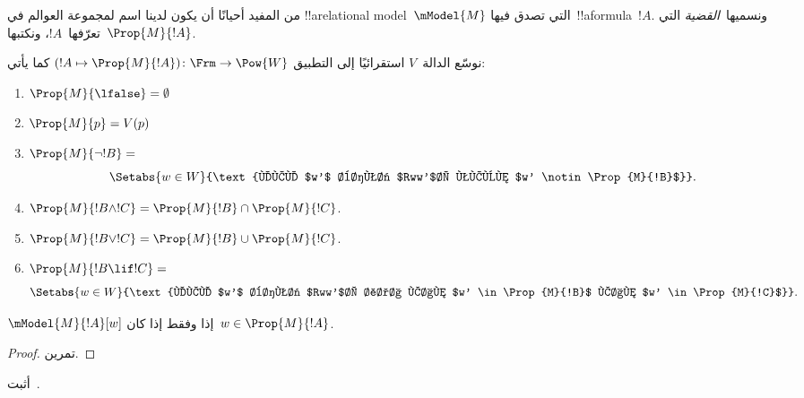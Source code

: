 \documentclass[../../../include/open-logic-section]{subfiles}
\begin{document}


من المفيد أحيانًا أن يكون لدينا اسم لمجموعة العوالم في
!!a{relational model}~$\mModel{M}$ التي تصدق فيها~!!a{formula}~$!A$.
ونسميها~\emph{القضية} التي تعرّفها~$!A$، ونكتبها~$\Prop{M}{!A}$.

\begin{defn}
  نوسّع الدالة~$V$ استقرائيًا إلى التطبيق
  $(!A \mapsto \Prop{M}{!A}) \colon \Frm \to \Pow{W}$ كما يأتي:
  \begin{enumerate}
  \item $\Prop{M}{\lfalse} = \emptyset$
  \item $\Prop{M}{p} = V(p)$
  \item $\Prop{M}{\lnot !B} = {}$
    \[
      \Setabs{w \in W}{\text{لكل $w'$ بحيث $Rww'$، يكون $w'
          \notin \Prop{M}{!B}$}}.
    \]
  \item $\Prop{M}{!B \land !C} = \Prop{M}{!B} \cap \Prop{M}{!C}$.
  \item $\Prop{M}{!B \lor !C} = \Prop{M}{!B} \cup \Prop{M}{!C}$.
  \item $\Prop{M}{!B \lif !C} = {}$
    \[
      \Setabs{w \in W}{\text{لكل $w'$ بحيث $Rww'$، إذا كان $w'
          \in \Prop{M}{!B}$ كان $w' \in \Prop{M}{!C}$}}.
    \]
  \end{enumerate}
\end{defn}

\begin{prop}
  $\mModel{M}{!A}[w]$ إذا وفقط إذا كان~$w \in \Prop{M}{!A}$.
\end{prop}

\begin{proof}
  تمرين.
\end{proof}

\begin{prob}
  أثبت~.
\end{prob}
\end{document}
